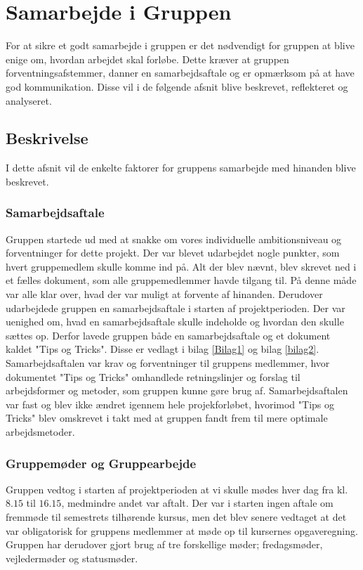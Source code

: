 \chapter{Samarbejde i Gruppen}
For at sikre et godt samarbejde i gruppen er det nødvendigt for gruppen at blive enige om, hvordan arbejdet skal forløbe. Dette kræver at gruppen forventningsafstemmer, danner en samarbejdsaftale og er opmærksom på at have god kommunikation. Disse vil i de følgende afsnit blive beskrevet, reflekteret og analyseret.

\section{Beskrivelse}
I dette afsnit vil de enkelte faktorer for gruppens samarbejde med hinanden blive beskrevet. 

\subsection{Samarbejdsaftale}
Gruppen startede ud med at snakke om vores individuelle ambitionsniveau og forventninger for dette projekt. Der var blevet udarbejdet nogle punkter, som hvert gruppemedlem skulle komme ind på. Alt der blev nævnt, blev skrevet ned i et fælles dokument, som alle gruppemedlemmer havde tilgang til. På denne måde var alle klar over, hvad der var muligt at forvente af hinanden. Derudover udarbejdede gruppen en samarbejdsaftale i starten af projektperioden. Der var uenighed om, hvad en samarbejdsaftale skulle indeholde og hvordan den skulle sættes op. Derfor lavede gruppen både en samarbejdsaftale og et dokument kaldet "Tips og Tricks". Disse er vedlagt i bilag \ref{Bilag1} og bilag \ref{bilag2}. Samarbejdsaftalen var krav og forventninger til gruppens medlemmer, hvor dokumentet "Tips og Tricks" omhandlede retningslinjer og forslag til arbejdsformer og metoder, som gruppen kunne gøre brug af. Samarbejdsaftalen var fast og blev ikke ændret igennem hele projekforløbet, hvorimod "Tips og Tricks" blev omskrevet i takt med at gruppen fandt frem til mere optimale arbejdsmetoder. 

\subsection{Gruppemøder og Gruppearbejde}
Gruppen vedtog i starten af projektperioden at vi skulle mødes hver dag fra kl. $8.15$ til $16.15$, medmindre andet var aftalt. Der var i starten ingen aftale om fremmøde til semestrets tilhørende kursus, men det blev senere vedtaget at det var obligatorisk for gruppens medlemmer at møde op til kursernes opgaveregning.
Gruppen har derudover gjort brug af tre forskellige møder; fredagsmøder, vejledermøder og statusmøder.

